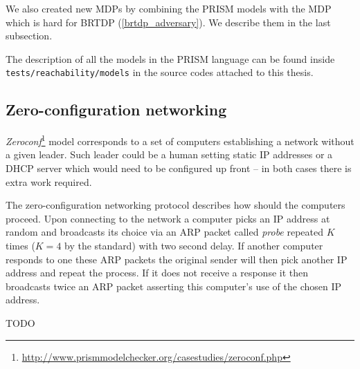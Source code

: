 We also created new MDPs by combining the PRISM models with the MDP
which is hard for BRTDP (\autoref{brtdp_adversary}). We describe them in
the last subsection.

The description of all the models in the PRISM language can be found inside
\verb|tests/reachability/models| in the source codes attached to this
thesis.

\subsection*{Zero-configuration networking}

{\em
Zeroconf}\footnote{\href{http://www.prismmodelchecker.org/casestudies/zeroconf.php}{http://www.prismmodelchecker.org/casestudies/zeroconf.php}} model corresponds to a set of computers establishing a
network without a given leader. Such leader could be a human setting
static IP addresses or a DHCP server which would need to be configured
up front -- in both cases there is extra work required.

The zero-configuration networking protocol describes how should the
computers proceed. Upon connecting to the network a computer picks an IP
address at random and broadcasts its choice via an ARP packet called
{\em probe} repeated $K$ times ($K=4$ by the standard) with two second
delay. If another computer responds to one these
ARP packets the original sender will then pick another IP address and
repeat the process. If it does not receive a response it then broadcasts
twice an ARP packet asserting this computer's use of the chosen IP
address.

TODO






